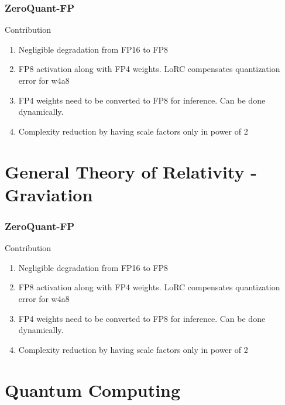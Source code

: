 \documentclass{beamer}
\theoremstyle{plain}
\theoremstyle{definition}
\theoremstyle{remark}
\numberwithin{equation}{section}
\numberwithin{figure}{section}
\numberwithin{theorem}{section}
\begin{document}
		
		
		

		\begin{frame}
			\frametitle{ZeroQuant-FP}
			Contribution
			\begin{enumerate}
				\item Negligible degradation from FP16 to FP8
				\item FP8 activation along with FP4 weights. LoRC compensates quantization error for w4a8
				\item FP4 weights need to be converted to FP8 for inference. Can be done dynamically. 
				\item Complexity reduction by having scale factors only in power of 2
			\end{enumerate}
		\end{frame}
		
		
\section{General Theory of Relativity - Graviation}
\begin{frame}
	\frametitle{ZeroQuant-FP}
	Contribution
	\begin{enumerate}
		\item Negligible degradation from FP16 to FP8
		\item FP8 activation along with FP4 weights. LoRC compensates quantization error for w4a8
		\item FP4 weights need to be converted to FP8 for inference. Can be done dynamically. 
		\item Complexity reduction by having scale factors only in power of 2
	\end{enumerate}
\end{frame}

		\section{Quantum Computing}
		
		
		
\end{document}
